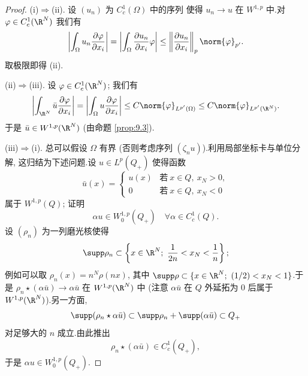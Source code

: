 \begin{proof}
\noindent (i)$\Rightarrow$(ii). 设 $(u_n)$ 为 $C_c^1(\Omega)$ 中的序列
使得 $u_n\to u$ 在 $W^{1,p}$ 中.对 $\varphi\in C_c^1(\R^N)$ 我们有
\begin{equation*}
\left|\int_\Omega u_n\frac{\partial\varphi}{\partial x_i}\right|
=\left|\int_\Omega\frac{\partial u_n}{\partial x_i}\varphi\right|
\le\left\|\frac{\partial u_n}{\partial x_i}\right\|_p
\norm{\varphi}_{p'}.
\end{equation*}
取极限即得 (ii).

\noindent (ii)$\Rightarrow$(iii). 设 $\varphi\in C_c^1(\R^N)$; 我们有
\begin{equation*}
\left|\int_{\R^N}\bar u\frac{\partial\varphi}{\partial x_i}\right|
=\left|\int_\Omega u\frac{\partial\varphi}{\partial x_i}\right|
\le C\norm{\varphi}_{L^{p'}(\Omega)}
\le C\norm{\varphi}_{L^{p'}(\R^N)}.
\end{equation*}
于是 $\bar u\in W^{1,p}(\R^N)$ (由命题  \ref{prop:9.3}).

\noindent (iii)$\Rightarrow$(i). 总可以假设 $\Omega$ 有界 (否则考虑序列
$(\zeta_nu)$).利用局部坐标卡与单位分解, 这归结为下述问题.设
$u\in L^p(Q_+)$ 使得函数
\begin{equation*}
\bar u(x)=
\begin{cases}
u(x) & \text{若}\ x\in Q,\ x_N>0,\\
0 & \text{若}\ x\in Q,\ x_N<0
\end{cases}
\end{equation*}
属于 $W^{1,p}(Q)$; 证明
\begin{equation*}
\alpha u\in W_0^{1,p}(Q_+)\quad\forall\alpha\in C_c^1(Q).
\end{equation*}
设 $(\rho_n)$ 为一列磨光核使得
\begin{equation*}
\supp\rho_n\subset\left\{x\in\R^N;\ \frac1{2n}<x_N<\frac1n\right\};
\end{equation*}
例如可以取 $\rho_n(x)=n^N\rho(nx)$, 其中
$\supp\rho\subset\{x\in\R^N;\ (1/2)<x_N<1\}$.于是
$\rho_n\star(\alpha\bar u)\to\alpha\bar u$ 在 $W^{1,p}(\R^N)$ 中 (注意
$\alpha\bar u$ 在 $Q$ 外延拓为 $0$ 后属于 $W^{1,p}(\R^N)$).另一方面,
\begin{equation*}
\supp(\rho_n\star\alpha\bar u)\subset\supp\rho_n+
\supp(\alpha\bar u)\subset Q_+
\end{equation*}
对足够大的 $n$ 成立.由此推出
\begin{equation*}
\rho_n\star(\alpha\bar u)\in C_c^1(Q_+),
\end{equation*}
于是 $\alpha u\in W_0^{1,p}(Q_+)$.
\end{proof}

